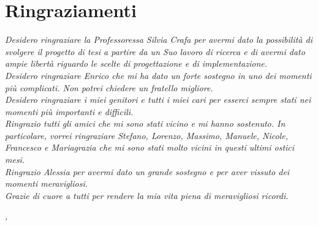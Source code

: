 
\cleardoublepage
{}
{}


\bigskip

\begingroup
\let\clearpage\relax
\let\cleardoublepage\relax
\let\cleardoublepage\relax

\chapter*{Ringraziamenti}
\noindent \textit{Desidero ringraziare la Professoressa Silvia Crafa per avermi dato la possibilità di 
svolgere il progetto di tesi a partire da un Suo lavoro di ricerca e di avermi dato ampie libertà riguardo 
le scelte di progettazione e di implementazione.}\\

\noindent \textit{Desidero ringraziare Enrico che mi ha dato un forte sostegno in uno dei momenti più 
complicati. Non potrei chiedere un fratello migliore.}\\

\noindent \textit{Desidero ringraziare i miei genitori e tutti i miei cari per esserci sempre stati nei 
momenti più importanti e difficili.}\\

\noindent \textit{Ringrazio tutti gli amici che mi sono stati vicino e mi hanno sostenuto. In particolare, 
vorrei ringraziare Stefano, Lorenzo, Massimo, Manuele, Nicole, Francesco e Mariagrazia che mi sono stati 
molto vicini in questi ultimi ostici mesi.}\\

\noindent \textit{Ringrazio Alessia per avermi dato un grande sostegno e per aver vissuto dei momenti 
meravigliosi.}\\

\noindent \textit{Grazie di cuore a tutti per rendere la mia vita piena di meravigliosi ricordi.}\\

\bigskip

\noindent\textit{\myLocation, \myTime}
\hfill \myName

\endgroup

